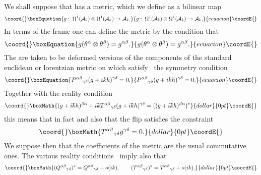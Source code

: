 \documentclass[12pt,a4paper]{article}
\newcounter{eg}
\def\b#1{{\mathbb #1}}
\def\c#1{{\cal #1}}
\def\kbar{{\mathchar'26\mkern-9muk}}
\def\cn#1{\cite{#1}}
\begin{document}
We shall suppose that \myHighlight{$\c{A}_\kbar$}\coordHE{} has a metric, which we define as a
bilinear map 
\begin{equation}\coord{}\boxEquation{
g:\; \Omega^1(\c{A}_\kbar) \otimes \Omega^1(\c{A}_\kbar) 
\rightarrow \c{A}_\kbar.                                        \label{metric} 
}{
g:\; \Omega^1(\c{A}_\kbar) \otimes \Omega^1(\c{A}_\kbar) 
\rightarrow \c{A}_\kbar.                                        }{ecuacion}\coordE{}\end{equation} 
In terms of the frame one can define the metric by the condition that
\begin{equation}\coord{}\boxEquation{
g(\theta^\alpha \otimes \theta^\beta)= g^{\alpha\beta}.          \label{f-m}
}{
g(\theta^\alpha \otimes \theta^\beta)= g^{\alpha\beta}.          }{ecuacion}\coordE{}\end{equation}
The \coordHE{} are taken to be deformed versions 
\myHighlight{$g^{\alpha\beta} \mapsto g^{\alpha\beta} + i \kbar h^{\alpha\beta}$}\coordHE{}
of the components of the standard euclidean or lorentzian metric
\coordHE{} on \myHighlight{$\b{R}^n$}\coordHE{} which satisfy~\cn{FioMad98a} the
symmetry condition
\begin{equation}\coord{}\boxEquation{
P^{\alpha\beta}{}_{\gamma\delta} (g+i\kbar h)^{\gamma\delta} = 0.   
                                                             \label{symmet}
}{
P^{\alpha\beta}{}_{\gamma\delta} (g+i\kbar h)^{\gamma\delta} = 0.   
                                                             }{ecuacion}\coordE{}\end{equation}
Together with the reality condition
$$\coord{}\boxMath{
(g+i\kbar h)^{\beta\alpha} + i\kbar T^{\alpha\beta}{}_{\gamma\delta}
(g+i\kbar h)^{\gamma\delta} = ((g+i\kbar h)^{\beta\alpha})^*
}{dollar}{0pt}\coordE{}$$
this means that in fact \coordHE{} and also that the flip
satisfies the constraint
$$\coord{}\boxMath{
T^{\alpha\beta}{}_{\gamma\delta}g^{\gamma\delta} = 0.
}{dollar}{0pt}\coordE{}$$
We suppose then that the coefficients of the metric are the usual
commutative ones. The various reality
conditions~\cite{Con95,FioMad98a} imply also that
$$\coord{}\boxMath{
(Q^{\alpha\beta}{}_{\gamma\delta})^* =
Q^{\alpha\beta}{}_{\gamma\delta} + o(i\kbar), \qquad
(T^{\alpha\beta}{}_{\gamma\delta})^* =
T^{\alpha\beta}{}_{\gamma\delta} + o(i\kbar).
}{dollar}{0pt}\coordE{}$$
\end{document}

